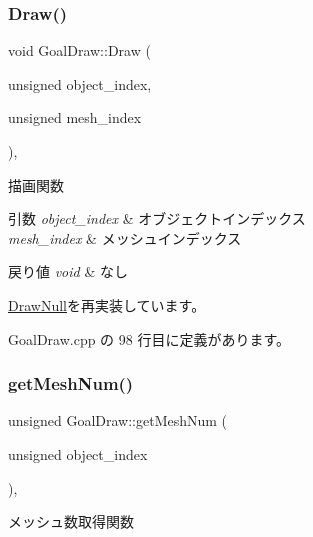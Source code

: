 \subsubsection{\texorpdfstring{Draw()}{Draw()}}
{\footnotesize\ttfamily void Goal\+Draw\+::\+Draw (\begin{DoxyParamCaption}\item[{unsigned}]{object\+\_\+index,  }\item[{unsigned}]{mesh\+\_\+index }\end{DoxyParamCaption})\hspace{0.3cm}{\ttfamily [override]}, {\ttfamily [virtual]}}



描画関数 


\begin{DoxyParams}{引数}
{\em object\+\_\+index} & オブジェクトインデックス \\
\hline
{\em mesh\+\_\+index} & メッシュインデックス \\
\hline
\end{DoxyParams}

\begin{DoxyRetVals}{戻り値}
{\em void} & なし \\
\hline
\end{DoxyRetVals}


\mbox{\hyperlink{class_draw_null_a72ac0b7dc40b1469582419dcc5b0e114}{Draw\+Null}}を再実装しています。



 Goal\+Draw.\+cpp の 98 行目に定義があります。

\mbox{\label{class_goal_draw_ac80c8da78cda7b15a4ce46f7d7057622}} 
\subsubsection{\texorpdfstring{get\+Mesh\+Num()}{getMeshNum()}}
{\footnotesize\ttfamily unsigned Goal\+Draw\+::get\+Mesh\+Num (\begin{DoxyParamCaption}\item[{unsigned}]{object\+\_\+index }\end{DoxyParamCaption})\hspace{0.3cm}{\ttfamily [override]}, {\ttfamily [virtual]}}



メッシュ数取得関数 


